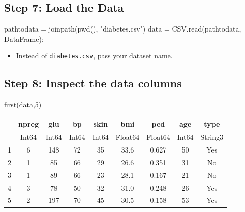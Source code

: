 \documentclass[
  letterpaper,
]{book}
\newenvironment{Shaded}{\begin{snugshade}}{\end{snugshade}}
\newcommand{\FloatTok}[1]{\textcolor[rgb]{0.68,0.00,0.00}{#1}}
\newcommand{\FunctionTok}[1]{\textcolor[rgb]{0.28,0.35,0.67}{#1}}
\newcommand{\NormalTok}[1]{\textcolor[rgb]{0.00,0.23,0.31}{#1}}
\newcommand{\OperatorTok}[1]{\textcolor[rgb]{0.37,0.37,0.37}{#1}}
\newcommand{\StringTok}[1]{\textcolor[rgb]{0.13,0.47,0.30}{#1}}
\providecommand{\tightlist}{%
  \setlength{\itemsep}{0pt}\setlength{\parskip}{0pt}}\usepackage{longtable,booktabs,array}
\begin{document}
\hypertarget{step-7-load-the-data}{%
\subsection*{Step 7: Load the Data}\label{step-7-load-the-data}}

\begin{Shaded}
\begin{Highlighting}[]
\NormalTok{pathtodata }\OperatorTok{=} \FunctionTok{joinpath}\NormalTok{(}\FunctionTok{pwd}\NormalTok{(), }\StringTok{"diabetes.csv"}\NormalTok{)}
\NormalTok{data }\OperatorTok{=}\NormalTok{ CSV.}\FunctionTok{read}\NormalTok{(pathtodata, DataFrame);}
\end{Highlighting}
\end{Shaded}

\begin{itemize}
\tightlist
\item
  Instead of \texttt{diabetes.csv}, pass your dataset name.
\end{itemize}

\hypertarget{step-8-inspect-the-data-columns}{%
\subsection*{Step 8: Inspect the data
columns}\label{step-8-inspect-the-data-columns}}

\begin{Shaded}
\begin{Highlighting}[]
\FunctionTok{first}\NormalTok{(data,}\FloatTok{5}\NormalTok{)}
\end{Highlighting}
\end{Shaded}

\begin{tabular}{r|cccccccc}
    & npreg & glu & bp & skin & bmi & ped & age & type\\
    \hline
    & Int64 & Int64 & Int64 & Int64 & Float64 & Float64 & Int64 & String3\\
    \hline
    1 & 6 & 148 & 72 & 35 & 33.6 & 0.627 & 50 & Yes \\
    2 & 1 & 85 & 66 & 29 & 26.6 & 0.351 & 31 & No \\
    3 & 1 & 89 & 66 & 23 & 28.1 & 0.167 & 21 & No \\
    4 & 3 & 78 & 50 & 32 & 31.0 & 0.248 & 26 & Yes \\
    5 & 2 & 197 & 70 & 45 & 30.5 & 0.158 & 53 & Yes \\
\end{tabular}
\end{document}
